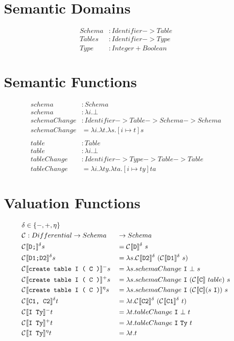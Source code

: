 \documentclass[12pt]{article}
\begin{document}
\section{Semantic Domains}
\begin{align*}
  Schema &: Identifier -> Table \\
  Tables &: Identifier -> Type \\
  Type &: Integer + Boolean
\end{align*}

\section{Semantic Functions}
\begin{align*}
  schema &: Schema \\
  schema &: \lambda i.\bot \\
  schemaChange &: Identifier -> Table -> Schema -> Schema \\
  schemaChange &= \lambda i. \lambda t. \lambda s. [ i \mapsto t ]s \\
  \\
  table &: Table \\
  table &: \lambda i.\bot \\
  tableChange &: Identifier -> Type -> Table -> Table \\
  tableChange &= \lambda i. \lambda ty. \lambda ta. [ i \mapsto ty ]ta
\end{align*}

\section{Valuation Functions}

\begin{alignat*}{2}
  &\delta \in \{-, +, \eta \} &&\\
  &\compsymbol : Differential -> Schema &&-> Schema \\
  &\comp{D;}{}^{\delta}s &&= \comp{D}{}^{\delta}\ s \\
  &\comp{D1;D2}{}^{\delta}s &&= \lambda s.\comp{D2}{}^{\delta}\ (\comp{D1}{}^{\delta}\ s) \\
  &\comp{create table I ( C )}{}^{-}s &&= \lambda s. schemaChange\ \mathtt{I}\ \bot\ s \\
  &\comp{create table I ( C )}{}^{+}s &&= \lambda s. schemaChange\ \mathtt{I}\ (\comp{C}{}\ table)\ s \\
  &\comp{create table I ( C )}{}{}^{\eta}s &&= \lambda s. schemaChange\ \mathtt{I}\ (\comp{C}{} (s\ \mathtt{I}))\ s\\
  &\comp{C1, C2}{}^{\delta}t &&= \lambda t.\comp{C2}{}^{\delta}\ (\comp{C1}{}^{\delta}\ t) \\
  &\comp{I Ty}{}^{-}t &&= \lambda t.tableChange\ \mathtt{I}\ \bot\ t \\
  &\comp{I Ty}{}^{+}t &&= \lambda t.tableChange\ \mathtt{I}\ \mathtt{Ty}\ t \\
  &\comp{I Ty}{}^{\eta}t &&= \lambda t. t \\
\end{alignat*}



\end{document}
